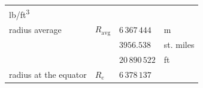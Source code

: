 \documentclass[
]{book}
\begin{document}
\begin{longtable}[]{@{}llll@{}}
\begin{minipage}[t]{0.05\columnwidth}
lb/ft\textsuperscript{3}\strut
\end{minipage}\tabularnewline
\begin{minipage}[t]{0.34\columnwidth}\raggedright
radius average\strut
\end{minipage} & \begin{minipage}[t]{0.06\columnwidth}\raggedright
\(R_{\mathrm{avg}}\)\strut
\end{minipage} & \begin{minipage}[t]{0.44\columnwidth}\raggedright
\(6\,367\,444\)\strut
\end{minipage} & \begin{minipage}[t]{0.05\columnwidth}\raggedright
m\strut
\end{minipage}\tabularnewline
\begin{minipage}[t]{0.34\columnwidth}\raggedright
\strut
\end{minipage} & \begin{minipage}[t]{0.06\columnwidth}\raggedright
\strut
\end{minipage} & \begin{minipage}[t]{0.44\columnwidth}\raggedright
\(3956.538\)\strut
\end{minipage} & \begin{minipage}[t]{0.05\columnwidth}\raggedright
st. miles\strut
\end{minipage}\tabularnewline
\begin{minipage}[t]{0.34\columnwidth}\raggedright
\strut
\end{minipage} & \begin{minipage}[t]{0.06\columnwidth}\raggedright
\strut
\end{minipage} & \begin{minipage}[t]{0.44\columnwidth}\raggedright
\(20\,890\,522\)\strut
\end{minipage} & \begin{minipage}[t]{0.05\columnwidth}\raggedright
ft\strut
\end{minipage}\tabularnewline
\begin{minipage}[t]{0.34\columnwidth}\raggedright
radius at the equator\strut
\end{minipage} & \begin{minipage}[t]{0.06\columnwidth}\raggedright
\(R_e\)\strut
\end{minipage} & \begin{minipage}[t]{0.44\columnwidth}\raggedright
\(6\,378\,137\)\strut
\end{minipage} & \begin{minipage}[t]{0.05\columnwidth}\raggedright

\end{minipage}
\end{longtable}
\end{document}

